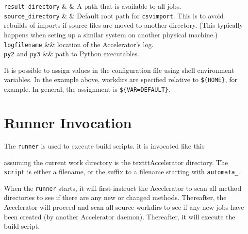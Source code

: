 \RP \texttt{result\_directory} & & A path that is available to all
jobs.    \\

\RP \texttt{source\_directory} & & Default root path for
\texttt{csvimport}.  This is to avoid rebuilds of imports if source
files are moved to another directory.  (This typically happens when
seting up a similar system on another physical machine.)\\

\RP \texttt{logfilename} && location of the Accelerator's log.\\

\RP \texttt{py2} and \texttt{py3} && path to Python executables.
\\

\stoptable
{}

It is possible to assign values in the configuration file using shell
environment variables.  In the example above, workdirs are specified
relative to \texttt{\$\{HOME\}}, for example.  In general, the
assignment is \texttt{\$\{VAR=DEFAULT\}}.

\section{Runner Invocation}
The \texttt{runner} is used to execute build scripts.  it is invocated
like this
\begin{shell}
\end{shell}
assuming the current work directory is the texttt{Accelerator}
directory.  The \texttt{script} is either a filename, or the suffix to
a filename starting with \texttt{automata\_}.

When the \texttt{runner} starts, it will first instruct the
Accelerator to scan all method directories to see if there are any new
or changed methods.  Thereafter, the Accelerator will proceed and scan
all source workdirs to see if any new jobs have been created (by
another Accelerator daemon).  Thereafter, it will execute the build
script.

